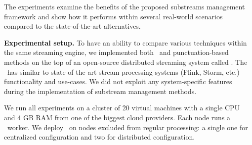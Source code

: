 
The experiments examine the benefits of the proposed substreams management framework and show how it performs within several real-world scenarios compared to the state-of-the-art alternatives.

{\noindent \bf Experimental setup.} To have an ability to compare various techniques within the same streaming engine, we implemented both \tracker\ and punctuation-based methods on the top of an open-source distributed streaming system called \FlameStream. The  \FlameStream\ has similar to state-of-the-art stream processing systems (Flink, Storm, etc.) functionality and use-cases. We did not exploit any system-specific features during the implementation of substream management methods.

We run all experiments on a cluster of 20 virtual machines with a single CPU and 4 GB RAM from one of the biggest cloud providers. Each node runs a \FlameStream\ worker. We deploy \tracker\ on nodes excluded from regular processing: a single one for centralized configuration and two for distributed configuration. 

